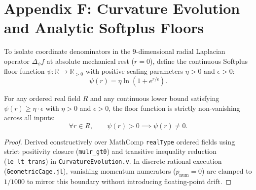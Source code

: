 \section*{Appendix F: Curvature Evolution and Analytic Softplus Floors}
\label{app:curvature}

\begin{definition}
To isolate coordinate denominators in the $9$-dimensional radial Laplacian operator $\Delta_\psi f$ at absolute mechanical rest ($r = 0$), define the continuous Softplus floor function $\psi : \mathbb{R} \to \mathbb{R}_{>0}$ with positive scaling parameters $\eta > 0$ and $\epsilon > 0$:
\begin{equation}
  \psi(r) = \eta \ln\!\left(1 + e^{r / \epsilon}\right).
\end{equation}
\end{definition}

\begin{lemma}
For any ordered real field $R$ and any continuous lower bound satisfying $\psi(r) \ge \eta \cdot \epsilon$ with $\eta > 0$ and $\epsilon > 0$, the floor function is strictly non-vanishing across all inputs:
\begin{equation}
  \forall r \in R, \qquad \psi(r) > 0 \implies \psi(r) \neq 0.
\end{equation}
\end{lemma}

\begin{proof}
Derived constructively over MathComp \texttt{realType} ordered fields using strict positivity closure (\texttt{mulr\_gt0}) and transitive inequality reduction (\texttt{le\_lt\_trans}) in \texttt{CurvatureEvolution.v}. In discrete rational execution (\texttt{GeometricCage.jl}), vanishing momentum numerators ($p_{\mathrm{num}} = 0$) are clamped to $1/1000$ to mirror this boundary without introducing floating-point drift.
\end{proof}
